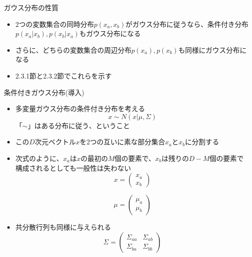 \begin{frame}{ガウス分布の性質}
 \begin{itemize}
  \item 2つの変数集合の同時分布$p(x_a,x_b)$がガウス分布に従うなら、条件付き分布$p(x_a|x_b),p(x_b|x_a)$もガウス分布になる
  \item さらに、どちらの変数集合の周辺分布$p(x_a),p(x_b)$も同様にガウス分布になる
  \item 2.3.1節と2.3.2節でこれらを示す
 \end{itemize}
\end{frame}

        \begin{frame}{条件付きガウス分布(導入)}
         \begin{itemize}
          \item 多変量ガウス分布の条件付き分布を考える
                \begin{equation}
                 x\sim N(x|\mu, \Sigma)
                \end{equation}
                「$\sim$」はある分布に従う、ということ
          \item この$D$次元ベクトル$x$を2つの互いに素な部分集合$x_a$と$x_b$に分割する
          \item 次式のように、$x_a$は$x$の最初の$M$個の要素で、$x_b$は残りの$D-M$個の要素で構成されるとしても一般性は失わない
                \begin{equation}
                 x =
                  \begin{pmatrix}
                   x_a \\
                   x_b
                  \end{pmatrix}
                \end{equation}

                \begin{equation}
                 \mu =
                  \begin{pmatrix}
                   \mu_a \\
                   \mu_b
                  \end{pmatrix}
                \end{equation}
          \item 共分散行列も同様に与えられる
                \begin{equation}
                 \Sigma =
                  \begin{pmatrix}
                   \Sigma_{aa} & \Sigma_{ab} \\
                   \Sigma_{ba} & \Sigma_{bb}
                  \end{pmatrix}
                \end{equation}
         \end{itemize}
        \end{frame}

